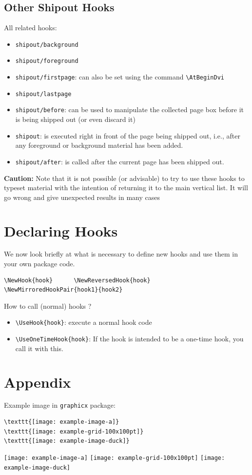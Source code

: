 \documentclass{article}
\newcommand\tbh{\textbackslash}
\begin{document}
\subsection{Other Shipout Hooks}
All related hooks:
\begin{itemize}
  \item \texttt{shipout/background}
  \item \texttt{shipout/foreground}
  \item \texttt{shipout/firstpage}: can also be set using the command \texttt{\tbh AtBeginDvi}
  \item \texttt{shipout/lastpage}
  \item \texttt{shipout/before}: can be used to manipulate the collected page box
    before it is being shipped out (or even discard it)
  \item \texttt{shipout}: is executed right in front of the
    page being shipped out, i.e., after any foreground or background material has been added. 
  \item \texttt{shipout/after}: is called after the current page has been shipped out.
\end{itemize}

\textbf{Caution:} Note that it is not possible (or advisable) to try to use these hooks to typeset
material with the intention of returning it to the main vertical list. It will go wrong and
give unexpected results in many cases 


\section{Declaring Hooks}
We now look briefly at what is necessary to define new
hooks and use them in your own package code.

\begin{lstlisting}
\NewHook{hook}      \NewReversedHook{hook}
\NewMirroredHookPair{hook1}{hook2}
\end{lstlisting}

How to call (normal) hooks ?
\begin{itemize}
  \item \texttt{\tbh UseHook\{hook\}}: execute a normal hook code
  \item \texttt{\tbh UseOneTimeHook\{hook\}}: If the hook is intended to be a one-time hook, you call it with this.
\end{itemize}

\section{Appendix}
Example image in \texttt{graphicx} package:
\begin{lstlisting}
\texttt{[image: example-image-a]}
\texttt{[image: example-grid-100x100pt]}
\texttt{[image: example-image-duck]}
\end{lstlisting}

\begin{center}
  \texttt{[image: example-image-a]}
  \texttt{[image: example-grid-100x100pt]}
  \texttt{[image: example-image-duck]}
\end{center}
\end{document}
